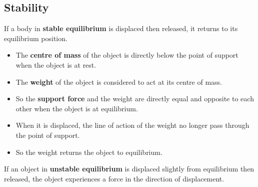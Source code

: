 \subsection{Stability}

If a body in \textbf{stable equilibrium} is displaced then released, it returns to its equilibrium position.
\begin{itemize}
    \item The \textbf{centre of mass} of the object is directly below the point of support when the object is at rest.
    \item The \textbf{weight} of the object is considered to act at its centre of mass.
    \item So the \textbf{support force} and the weight are directly equal and opposite to each other when the object is at equilibrium.
    \item When it is displaced, the line of action of the weight no longer pass through the point of support.
    \item So the weight returns the object to equilibrium.
\end{itemize}

If an object in \textbf{unstable equilibrium} is displaced slightly from equilibrium then released, the object experiences a force in the direction of displacement.
